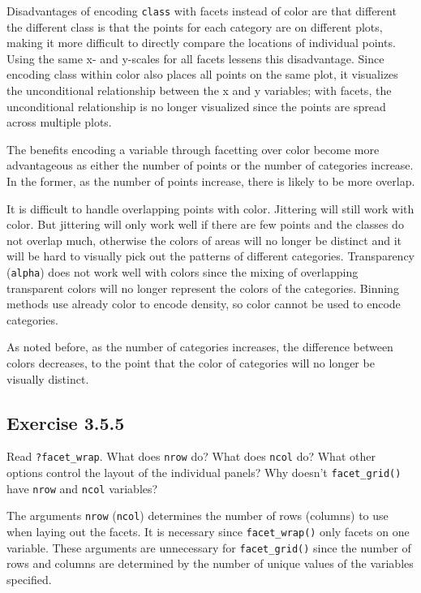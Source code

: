 \documentclass[]{book}
\theoremstyle{plain}
\theoremstyle{remark}
\theoremstyle{definition}
\theoremstyle{definition}
\theoremstyle{definition}
\theoremstyle{remark}
\begin{document}
Disadvantages of encoding \texttt{class} with facets instead of color
are that different the different class is that the points for each
category are on different plots, making it more difficult to directly
compare the locations of individual points. Using the same x- and
y-scales for all facets lessens this disadvantage. Since encoding class
within color also places all points on the same plot, it visualizes the
unconditional relationship between the x and y variables; with facets,
the unconditional relationship is no longer visualized since the points
are spread across multiple plots.

The benefits encoding a variable through facetting over color become
more advantageous as either the number of points or the number of
categories increase. In the former, as the number of points increase,
there is likely to be more overlap.

It is difficult to handle overlapping points with color. Jittering will
still work with color. But jittering will only work well if there are
few points and the classes do not overlap much, otherwise the colors of
areas will no longer be distinct and it will be hard to visually pick
out the patterns of different categories. Transparency (\texttt{alpha})
does not work well with colors since the mixing of overlapping
transparent colors will no longer represent the colors of the
categories. Binning methods use already color to encode density, so
color cannot be used to encode categories.

As noted before, as the number of categories increases, the difference
between colors decreases, to the point that the color of categories will
no longer be visually distinct.

\hypertarget{exercise-3.5.5}{%
\subsection*{\texorpdfstring{Exercise
{3.5.5}}{Exercise 3.5.5}}\label{exercise-3.5.5}}

Read \texttt{?facet\_wrap}. What does \texttt{nrow} do? What does
\texttt{ncol} do? What other options control the layout of the
individual panels? Why doesn't \texttt{facet\_grid()} have \texttt{nrow}
and \texttt{ncol} variables?

The arguments \texttt{nrow} (\texttt{ncol}) determines the number of
rows (columns) to use when laying out the facets. It is necessary since
\texttt{facet\_wrap()} only facets on one variable. These arguments are
unnecessary for \texttt{facet\_grid()} since the number of rows and
columns are determined by the number of unique values of the variables
specified.
\end{document}
